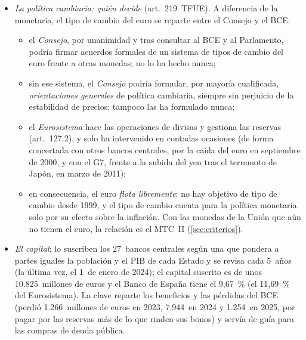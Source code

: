 \documentclass[11pt]{article}
\begin{document}
\begin{infografia}[H]
\centering
\caption{El sistema de rotación de votos del Consejo de Gobierno (2026, 21~gobernadores)}\label{figu:rotacion}
\end{infografia}

\begin{itemize}
\item \emph{La política cambiaria: quién decide} (art.~219~TFUE)\nocite{TFUE2016}. A diferencia de la monetaria, el tipo de cambio del euro se reparte entre el Consejo y el BCE:
  \begin{itemize}
  \item el \emph{Consejo}, por unanimidad y tras consultar al BCE y al Parlamento, podría firmar acuerdos formales de un sistema de tipos de cambio del euro frente a otras monedas; no lo ha hecho nunca;
  \item sin ese sistema, el \emph{Consejo} podría formular, por mayoría cualificada, \emph{orientaciones generales} de política cambiaria, siempre sin perjuicio de la estabilidad de precios; tampoco las ha formulado nunca;
  \item el \emph{Eurosistema} hace las operaciones de divisas y gestiona las reservas (art.~127.2), y solo ha intervenido en contadas ocasiones (de forma concertada con otros bancos centrales, por la caída del euro en septiembre de 2000, y con el G7, frente a la subida del yen tras el terremoto de Japón, en marzo de 2011)\nocite{BCE2000Intervencion,G72011Declaracion};
  \item en consecuencia, el euro \emph{flota libremente}: no hay objetivo de tipo de cambio desde 1999, y el tipo de cambio cuenta para la política monetaria solo por su efecto sobre la inflación. Con las monedas de la Unión que aún no tienen el euro, la relación es el MTC~II (\ref{sec:criterios}).
  \end{itemize}
\item \emph{El capital}: lo suscriben los 27~bancos centrales según una  que pondera a partes iguales la población y el PIB de cada Estado y se revisa cada 5~años (la última vez, el 1~de enero de 2024); el capital suscrito es de unos 10.825~millones de euros y el Banco de España tiene el 9,67~\% (el 11,69~\% del Eurosistema). La clave reparte los beneficios y las pérdidas del BCE (perdió 1.266~millones de euros en 2023, 7.944~en 2024 y 1.254~en 2025, por pagar por las reservas más de lo que rinden sus bonos) y servía de guía para las compras de deuda pública\nocite{BCE2026Capital,BCE2026Cuentas2025}.
\end{itemize}
\end{document}
